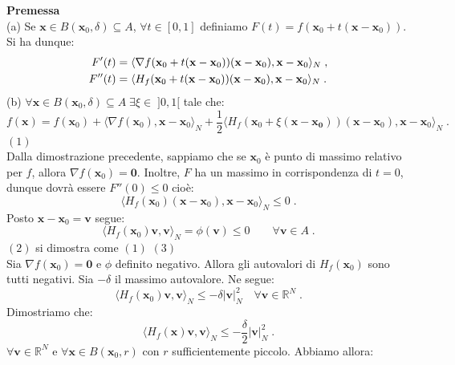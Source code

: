 \documentclass[a4paper,12pt]{report}
\theoremstyle{plain}
\theoremstyle{definition}
\theoremstyle{remark}
\numberwithin{equation}{section}
\begin{document}
\textbf{Premessa} \\
(a) Se $\mathbf{x} \in B(\mathbf{x}_0,\delta)\subseteq A$, $\forall t \in [0,1]$ definiamo $F(t)=f(\mathbf{x}_0+t(\mathbf{x}-\mathbf{x}_0))$. 
Si ha dunque:
\begin{align}
F'(t) &=\langle \nabla f(\mathbf{x}_0+t(\mathbf{x}-\mathbf{x}_0))(\mathbf{x}-\mathbf{x}_0),\mathbf{x}-\mathbf{x}_0\rangle_N\;, \notag \\
F''(t) &= \langle H_f(\mathbf{x}_0+t(\mathbf{x}-\mathbf{x}_0))(\mathbf{x}-\mathbf{x}_0),\mathbf{x}-\mathbf{x}_0\rangle_N\;.
\end{align}
(b) $\forall \mathbf{x} \in B(\mathbf{x}_0,\delta)\subseteq A\; \exists \xi \in\; ]0,1[$ tale che:
\begin{equation}
f(\mathbf{x})=f(\mathbf{x}_0)+\langle \nabla f(\mathbf{x}_0),\mathbf{x}-\mathbf{x}_0\rangle_N+\frac{1}{2}\langle H_f(\mathbf{x}_0+\xi
(\mathbf{x}-\mathbf{x_0}))(\mathbf{x}-\mathbf{x}_0),\mathbf{x}-\mathbf{x}_0\rangle_N\;.
\end{equation}
\proof $(1)$ \\
Dalla dimostrazione precedente, sappiamo che se $\mathbf{x}_0$ è punto di massimo relativo per $f$, allora $\nabla f(\mathbf{x}_0)=
\mathbf{0}$. Inoltre, $F$ ha un massimo in corrispondenza di $t=0$, dunque dovrà essere $F''(0)\le 0$ cioè:
\begin{equation}
\langle H_f(\mathbf{x}_0)(\mathbf{x}-\mathbf{x}_0),\mathbf{x}-\mathbf{x}_0\rangle_N \le 0\;.
\end{equation}
Posto $\mathbf{x}-\mathbf{x}_0=\mathbf{v}$ segue:
\begin{equation}
\langle H_f(\mathbf{x}_0)\mathbf{v},\mathbf{v}\rangle_N=\phi(\mathbf{v})\le 0 \qquad \forall \mathbf{v} \in A\;.
\end{equation}
\endproof
$(2)$ si dimostra come $(1)$
\proof $(3)$ \\
Sia $\nabla f(\mathbf{x}_0)=\mathbf{0}$ e $\phi$ definito negativo. Allora gli autovalori di $H_f(\mathbf{x}_0)$ sono tutti negativi. Sia 
$-\delta$ il massimo autovalore. Ne segue:
\begin{equation}
\langle H_f(\mathbf{x}_0)\mathbf{v},\mathbf{v}\rangle_N \le -\delta|\mathbf{v}|_N^2 \quad \forall \mathbf{v} \in \mathbb{R}^N \;. \label{ch4_hnegativo}
\end{equation}
Dimostriamo che:
\begin{equation}
\langle H_f(\mathbf{x})\mathbf{v},\mathbf{v}\rangle_N \le -\frac{\delta}{2}|\mathbf{v}|_N^2\;.
\end{equation}
$\forall \mathbf{v} \in \mathbb{R}^N$ e $\forall \mathbf{x} \in B(\mathbf{x}_0,r)$ con $r$ sufficientemente piccolo. Abbiamo allora:
\end{document}
